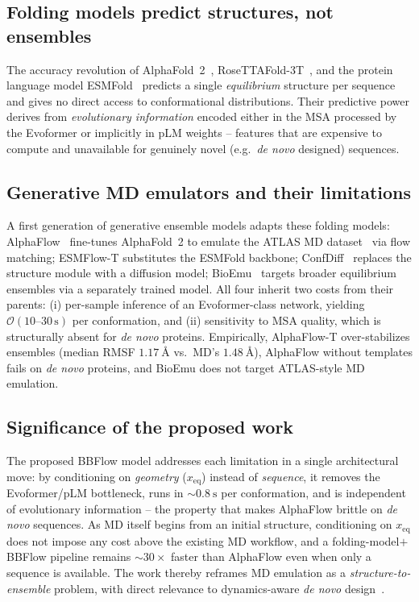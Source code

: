 \documentclass[12pt]{article}
\begin{document}
\subsection{Folding models predict structures, not ensembles}
The accuracy revolution of AlphaFold~2~\cite{jumper2021af2}, RoseTTAFold-3T~\cite{baek2021rosettafold},
and the protein language model ESMFold~\cite{lin2023esm2} predicts a single
\emph{equilibrium} structure per sequence and gives no direct access to
conformational distributions. Their predictive power derives from
\emph{evolutionary information} encoded either in the MSA processed by the
Evoformer or implicitly in pLM weights -- features that are expensive to compute
and unavailable for genuinely novel (e.g.\ \emph{de novo} designed) sequences.

\subsection{Generative MD emulators and their limitations}
A first generation of generative ensemble models adapts these folding models:
AlphaFlow~\cite{jing2024alphaflow} fine-tunes AlphaFold~2 to emulate the ATLAS
MD dataset~\cite{vandermeersche2024atlas} via flow matching; ESMFlow-T
substitutes the ESMFold backbone; ConfDiff~\cite{wang2024confdiff} replaces the
structure module with a diffusion model; BioEmu~\cite{lewis2025bioemu} targets
broader equilibrium ensembles via a separately trained model. All four inherit
two costs from their parents: (i) per-sample inference of an Evoformer-class
network, yielding $\mathcal{O}(10\text{--}30\,\mathrm{s})$ per conformation, and
(ii) sensitivity to MSA quality, which is structurally absent for \emph{de novo}
proteins. Empirically, AlphaFlow-T over-stabilizes ensembles (median RMSF
$1.17~$\AA{} vs.\ MD's $1.48~$\AA), AlphaFlow without templates fails on
\emph{de novo} proteins, and BioEmu does not target ATLAS-style MD emulation.

\subsection{Significance of the proposed work}
The proposed BBFlow model addresses each limitation in a single architectural
move: by conditioning on \emph{geometry} ($x_{\mathrm{eq}}$) instead of
\emph{sequence}, it removes the Evoformer/pLM bottleneck, runs in
$\sim 0.8~\mathrm{s}$ per conformation, and is independent of evolutionary
information -- the property that makes AlphaFlow brittle on \emph{de novo}
sequences. As MD itself begins from an initial structure, conditioning on
$x_{\mathrm{eq}}$ does not impose any cost above the existing MD workflow, and a
folding-model$+$BBFlow pipeline remains $\sim 30\times$ faster than AlphaFlow even
when only a sequence is available. The work thereby reframes MD emulation as a
\emph{structure-to-ensemble} problem, with direct relevance to dynamics-aware
\emph{de novo} design~\cite{viliuga2025flexibility, komorowska2025nmatune,
guo2025dynamic}.
\end{document}
